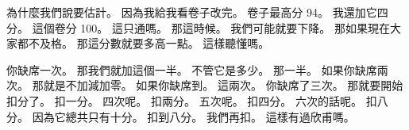 \hypertarget{c01:cue:1810}{}為什麼我們說要估計。
\hypertarget{c01:cue:1811}{}因為我給我看卷子改完。
\hypertarget{c01:cue:1812}{}卷子最高分 94。
\hypertarget{c01:cue:1813}{}我還加它四分。
\hypertarget{c01:cue:1814}{}這個卷分 100。
\hypertarget{c01:cue:1815}{}這只通嗎。
\hypertarget{c01:cue:1816}{}那這時候。
\hypertarget{c01:cue:1817}{}我們可能就要下降。
\hypertarget{c01:cue:1818}{}那如果現在大家都不及格。
\hypertarget{c01:cue:1819}{}那這分數就要多高一點。
\hypertarget{c01:cue:1820}{}這樣聽懂嗎。

\hypertarget{c01:cue:1821}{}你缺席一次。
\hypertarget{c01:cue:1822}{}那我們就加這個一半。
\hypertarget{c01:cue:1823}{}不管它是多少。
\hypertarget{c01:cue:1824}{}那一半。
\hypertarget{c01:cue:1825}{}如果你缺席兩次。
\hypertarget{c01:cue:1826}{}那就是不加減加零。
\hypertarget{c01:cue:1827}{}如果你缺席到。
\hypertarget{c01:cue:1828}{}這兩次。
\hypertarget{c01:cue:1829}{}你缺席了三次。
\hypertarget{c01:cue:1830}{}那就要開始扣分了。
\hypertarget{c01:cue:1831}{}扣一分。
\hypertarget{c01:cue:1832}{}四次呢。
\hypertarget{c01:cue:1833}{}扣兩分。
\hypertarget{c01:cue:1834}{}五次呢。
\hypertarget{c01:cue:1835}{}扣四分。
\hypertarget{c01:cue:1836}{}六次的話呢。
\hypertarget{c01:cue:1837}{}扣八分。
\hypertarget{c01:cue:1838}{}因為它總共只有十分。
\hypertarget{c01:cue:1839}{}扣到八分。
\hypertarget{c01:cue:1840}{}我們再扣。
\hypertarget{c01:cue:1841}{}這樣有過欣甫嗎。

